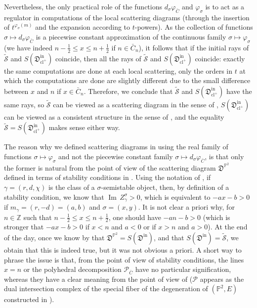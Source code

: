 \documentclass[11pt,letterpaper]{amsart}
\newcommand\PP{\mathbb P}
\newcommand\Z{\mathbb Z}
\newcommand\fD{\mathfrak D}
\newcommand\Ima{\operatorname{Im}\,}
\newcommand\cl{\operatorname{cl}}
\newcommand\iin{\mathrm{in}}
\begin{document}
Nevertheless, the only practical role of the functions 
$d_\sigma \varphi_{\bar{C}}$ and $\varphi_\sigma$ is to act as a regulator in computations of the local scattering diagrams (through the insertion of $t^{\varphi_\sigma(m)}$ and the expansion according to $t$-powers). As the collection of functions $\sigma \mapsto d_\sigma \varphi_{\bar{C}}$ is a piecewise constant approximation of the continuous family 
$\sigma \mapsto \varphi_\sigma$ (we have indeed $n-\frac{1}{2}\leqslant x \leqslant n+\frac{1}{2}$ if $n \in \bar{C}_n$), it follows that if the initial rays of $\tilde{\mathcal{S}}$ and $S(\fD^\iin_{\cl^+})$ coincide, then all the rays of 
$\tilde{\mathcal{S}}$ and $S(\fD^\iin_{\cl^+})$ coincide: exactly the same computations are done at each local scattering, only the orders in $t$ at which the computations are done are slightly different due to the small difference between $x$ and $n$ if $x \in \bar{C}_n$.
Therefore, we conclude that $\tilde{\mathcal{S}}$ and $S(\fD^\iin_{\cl^+})$ have the same rays, so $\tilde{\mathcal{S}}$ can be viewed as a scattering diagram in the sense of  \cite[\S 1.2]{bousseau2019scattering}, $S(\fD^\iin_{\cl^+})$ can be viewed as a consistent structure in the sense of \cite{MR2846484}, and the equality 
$\tilde{\mathcal{S}}=S(\fD^{\iin}_{\cl^+})$
makes sense either way.

The reason why we defined scattering diagrams in \cite[\S 1.2]{bousseau2019scattering} using the real family of functions $\sigma \mapsto \varphi_\sigma$ and not the piecewise constant family $\sigma \mapsto d_{\sigma} \varphi_{\bar{C}}$, 
is that only the former is natural from the point of view of the scattering diagram $\fD^{\PP^2}$ defined  in terms of stability conditions
in 
\cite[\S 2]{bousseau2019scattering}.
Using the notation of \cite{bousseau2019scattering}, if
$\gamma=(r,d,\chi)$ is the class of a  
$\sigma$-semistable object, then, by definition of a stability condition, we know that $\Ima Z_\gamma^\sigma>0$, which is equivalent to $-ax-b>0$ if $m_\gamma=(r,-d)=(a,b)$ and $\sigma=(x,y)$. It is not clear a priori why, for $n \in \Z$ such that $n-\frac{1}{2}\leqslant x \leqslant n+\frac{1}{2}$, one should have $-an-b>0$ (which is stronger that $-ax-b>0$ if $x<n$ and $a<0$ or if $x>n$ and $a>0$). At the end of the day, once we know by  \cite[Theorem 5.2]{bousseau2019scattering} that $\fD^{\PP^2}
=S(\fD^\iin)$, and that $S(\fD^\iin)=\tilde{\mathcal{S}}$, we obtain that this is indeed true, but it was not obvious a priori. A short way to phrase the issue is that, from the point of view of stability conditions, the lines $x=n$ or the polyhedral decomposition $\mathscr{P}_{\bar{C}}$ have no particular signification, whereas they have a clear meaning from the point of view of \cite{MR2846484} ($\mathscr{P}$ appears as the dual intersection complex of the special fiber of the degeneration of $(\PP^2,E)$ constructed in \cite[\S 1]{gabele2019tropical}).
\end{document}
